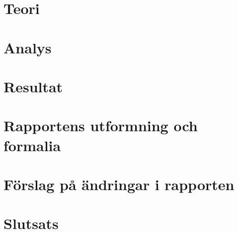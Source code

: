 \documentclass[12pt,a4paper,twoside,openright]{report}
\begin{document}
\section{Teori}

\section{Analys}

\section{Resultat}

\section{Rapportens utformning och formalia}

\section{Förslag på ändringar i rapporten}

\section{Slutsats}
\end{document}
